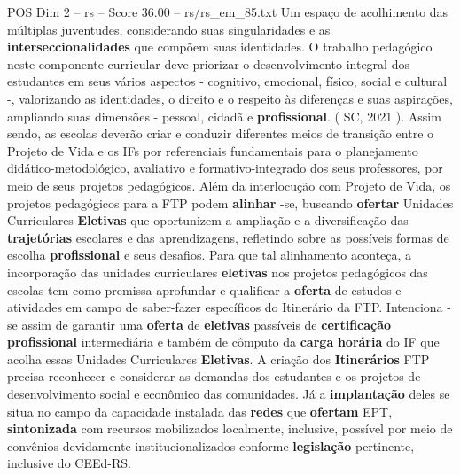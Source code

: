 \begin{textsample}{POS Dim 2 – rs – Score 36.00 – rs/rs\_em\_85.txt}
Um espaço de acolhimento das múltiplas juventudes, considerando suas singularidades e as \textbf{interseccionalidades} que compõem suas identidades.
O trabalho pedagógico neste componente curricular deve priorizar o desenvolvimento integral dos estudantes em seus vários aspectos - cognitivo, emocional, físico, social e cultural -, valorizando as identidades, o direito e o respeito às diferenças e suas aspirações, ampliando suas dimensões - pessoal, cidadã e \textbf{profissional}. ( SC, 2021 ).
Assim sendo, as escolas deverão criar e conduzir diferentes meios de transição entre o Projeto de Vida e os IFs por referenciais fundamentais para o planejamento didático-metodológico, avaliativo e formativo-integrado dos seus professores, por meio de seus projetos pedagógicos.
Além da interlocução com Projeto de Vida, os projetos pedagógicos para a FTP podem \textbf{alinhar} -se, buscando \textbf{ofertar} Unidades Curriculares \textbf{Eletivas} que oportunizem a ampliação e a diversificação das \textbf{trajetórias} escolares e das aprendizagens, refletindo sobre as possíveis formas de escolha \textbf{profissional} e seus desafios.
Para que tal alinhamento aconteça, a incorporação das unidades curriculares \textbf{eletivas} nos projetos pedagógicos das escolas tem como premissa aprofundar e qualificar a \textbf{oferta} de estudos e atividades em campo de saber-fazer específicos do Itinerário da FTP.
Intenciona -se assim de garantir uma \textbf{oferta} de \textbf{eletivas} passíveis de \textbf{certificação} \textbf{profissional} intermediária e também de cômputo da \textbf{carga} \textbf{horária} do IF que acolha essas Unidades Curriculares \textbf{Eletivas}.
A criação dos \textbf{Itinerários} FTP precisa reconhecer e considerar as demandas dos estudantes e os projetos de desenvolvimento social e econômico das comunidades.
Já a \textbf{implantação} deles se situa no campo da capacidade instalada das \textbf{redes} que \textbf{ofertam} EPT, \textbf{sintonizada} com recursos mobilizados localmente, inclusive, possível por meio de convênios devidamente institucionalizados conforme \textbf{legislação} pertinente, inclusive do CEEd-RS.

\end{textsample}
